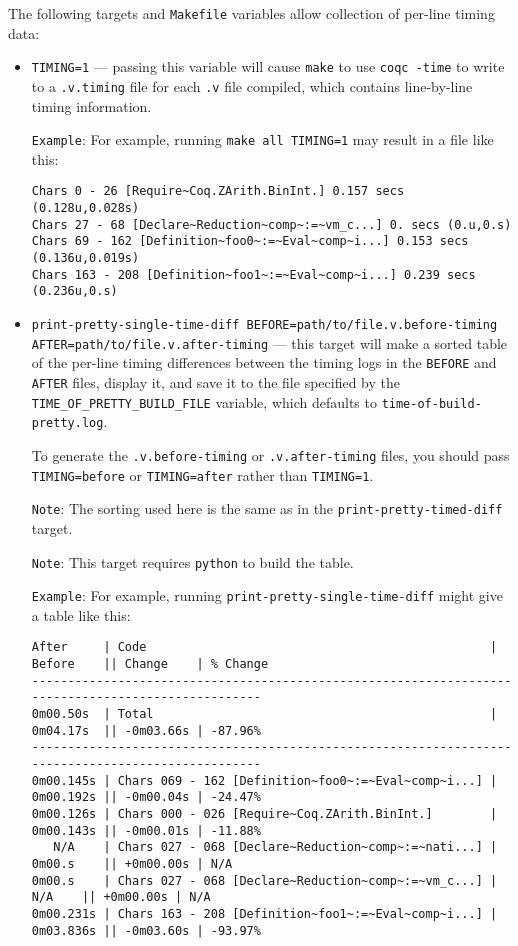 The following targets and \texttt{Makefile} variables allow collection
of per-line timing data:
\begin{itemize}
\item \texttt{TIMING=1} --- passing this variable will cause
  \texttt{make} to use \texttt{coqc -time} to write to a
  \texttt{.v.timing} file for each \texttt{.v} file compiled, which
  contains line-by-line timing information.

  \texttt{Example}: For example, running \texttt{make all TIMING=1} may
  result in a file like this:
\begin{verbatim}
Chars 0 - 26 [Require~Coq.ZArith.BinInt.] 0.157 secs (0.128u,0.028s)
Chars 27 - 68 [Declare~Reduction~comp~:=~vm_c...] 0. secs (0.u,0.s)
Chars 69 - 162 [Definition~foo0~:=~Eval~comp~i...] 0.153 secs (0.136u,0.019s)
Chars 163 - 208 [Definition~foo1~:=~Eval~comp~i...] 0.239 secs (0.236u,0.s)
\end{verbatim}

\item \texttt{print-pretty-single-time-diff
  BEFORE=path/to/file.v.before-timing
  AFTER=path/to/file.v.after-timing} --- this target will make a
  sorted table of the per-line timing differences between the timing
  logs in the \texttt{BEFORE} and \texttt{AFTER} files, display it,
  and save it to the file specified by the
  \texttt{TIME\_OF\_PRETTY\_BUILD\_FILE} variable, which defaults to
  \texttt{time-of-build-pretty.log}.

  To generate the \texttt{.v.before-timing} or
  \texttt{.v.after-timing} files, you should pass
  \texttt{TIMING=before} or \texttt{TIMING=after} rather than
  \texttt{TIMING=1}.

  \texttt{Note}: The sorting used here is the same as in the
  \texttt{print-pretty-timed-diff} target.

  \texttt{Note}: This target requires \texttt{python} to build the table.

  \texttt{Example}: For example, running
  \texttt{print-pretty-single-time-diff} might give a table like this:
\begin{verbatim}
After     | Code                                                | Before    || Change    | % Change
---------------------------------------------------------------------------------------------------
0m00.50s  | Total                                               | 0m04.17s  || -0m03.66s | -87.96%
---------------------------------------------------------------------------------------------------
0m00.145s | Chars 069 - 162 [Definition~foo0~:=~Eval~comp~i...] | 0m00.192s || -0m00.04s | -24.47%
0m00.126s | Chars 000 - 026 [Require~Coq.ZArith.BinInt.]        | 0m00.143s || -0m00.01s | -11.88%
   N/A    | Chars 027 - 068 [Declare~Reduction~comp~:=~nati...] | 0m00.s    || +0m00.00s | N/A
0m00.s    | Chars 027 - 068 [Declare~Reduction~comp~:=~vm_c...] |    N/A    || +0m00.00s | N/A
0m00.231s | Chars 163 - 208 [Definition~foo1~:=~Eval~comp~i...] | 0m03.836s || -0m03.60s | -93.97%
\end{verbatim}


\end{itemize}

